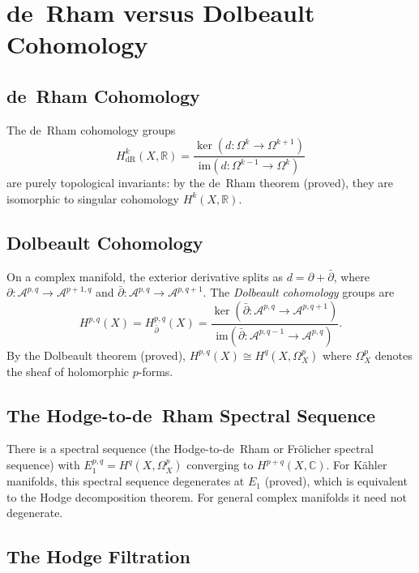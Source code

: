 \documentclass[12pt,a4paper]{amsart}
\theoremstyle{definition}
\theoremstyle{remark}
\begin{document}
\section{de~Rham versus Dolbeault Cohomology}
\label{sec:cohomology}

\subsection{de~Rham Cohomology}

The de~Rham cohomology groups
\[
  H^k_{\mathrm{dR}}(X, \mathbb{R}) = \frac{\ker(d: \Omega^k \to \Omega^{k+1})}{\mathrm{im}(d: \Omega^{k-1} \to \Omega^k)}
\]
are purely topological invariants: by the de~Rham theorem (proved), they are
isomorphic to singular cohomology $H^k(X, \mathbb{R})$.

\subsection{Dolbeault Cohomology}

On a complex manifold, the exterior derivative splits as $d = \partial + \bar\partial$,
where $\partial: \mathcal{A}^{p,q} \to \mathcal{A}^{p+1,q}$ and $\bar\partial:
\mathcal{A}^{p,q} \to \mathcal{A}^{p,q+1}$. The \emph{Dolbeault cohomology} groups are
\[
  H^{p,q}(X) = H^{p,q}_{\bar\partial}(X) = \frac{\ker(\bar\partial: \mathcal{A}^{p,q} \to \mathcal{A}^{p,q+1})}{\mathrm{im}(\bar\partial: \mathcal{A}^{p,q-1} \to \mathcal{A}^{p,q})}.
\]
By the Dolbeault theorem (proved), $H^{p,q}(X) \cong H^q(X, \Omega^p_X)$ where
$\Omega^p_X$ denotes the sheaf of holomorphic $p$-forms.

\subsection{The Hodge-to-de~Rham Spectral Sequence}

There is a spectral sequence (the Hodge-to-de~Rham or Fr\"olicher spectral sequence)
with $E_1^{p,q} = H^q(X, \Omega^p_X)$ converging to $H^{p+q}(X, \mathbb{C})$.
For Kähler manifolds, this spectral sequence degenerates at $E_1$ (proved), which is
equivalent to the Hodge decomposition theorem. For general complex manifolds it need
not degenerate.

\subsection{The Hodge Filtration}
\end{document}
